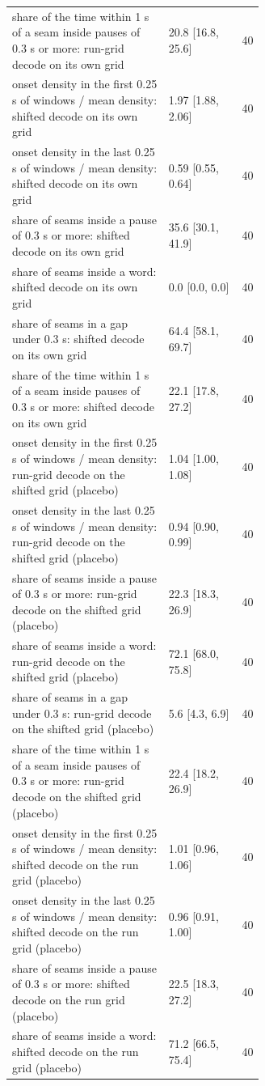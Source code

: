 {\begin{tabular}{@{}p{0.62\linewidth}lr@{}}
share of the time within 1 s of a seam inside pauses of 0.3 s or more: run-grid decode on its own grid & 20.8 [16.8, 25.6] & 40 \\
onset density in the first 0.25 s of windows / mean density: shifted decode on its own grid & 1.97 [1.88, 2.06] & 40 \\
onset density in the last 0.25 s of windows / mean density: shifted decode on its own grid & 0.59 [0.55, 0.64] & 40 \\
share of seams inside a pause of 0.3 s or more: shifted decode on its own grid & 35.6 [30.1, 41.9] & 40 \\
share of seams inside a word: shifted decode on its own grid & 0.0 [0.0, 0.0] & 40 \\
share of seams in a gap under 0.3 s: shifted decode on its own grid & 64.4 [58.1, 69.7] & 40 \\
share of the time within 1 s of a seam inside pauses of 0.3 s or more: shifted decode on its own grid & 22.1 [17.8, 27.2] & 40 \\
onset density in the first 0.25 s of windows / mean density: run-grid decode on the shifted grid (placebo) & 1.04 [1.00, 1.08] & 40 \\
onset density in the last 0.25 s of windows / mean density: run-grid decode on the shifted grid (placebo) & 0.94 [0.90, 0.99] & 40 \\
share of seams inside a pause of 0.3 s or more: run-grid decode on the shifted grid (placebo) & 22.3 [18.3, 26.9] & 40 \\
share of seams inside a word: run-grid decode on the shifted grid (placebo) & 72.1 [68.0, 75.8] & 40 \\
share of seams in a gap under 0.3 s: run-grid decode on the shifted grid (placebo) & 5.6 [4.3, 6.9] & 40 \\
share of the time within 1 s of a seam inside pauses of 0.3 s or more: run-grid decode on the shifted grid (placebo) & 22.4 [18.2, 26.9] & 40 \\
onset density in the first 0.25 s of windows / mean density: shifted decode on the run grid (placebo) & 1.01 [0.96, 1.06] & 40 \\
onset density in the last 0.25 s of windows / mean density: shifted decode on the run grid (placebo) & 0.96 [0.91, 1.00] & 40 \\
share of seams inside a pause of 0.3 s or more: shifted decode on the run grid (placebo) & 22.5 [18.3, 27.2] & 40 \\
share of seams inside a word: shifted decode on the run grid (placebo) & 71.2 [66.5, 75.4] & 40 \\

\end{tabular}}
